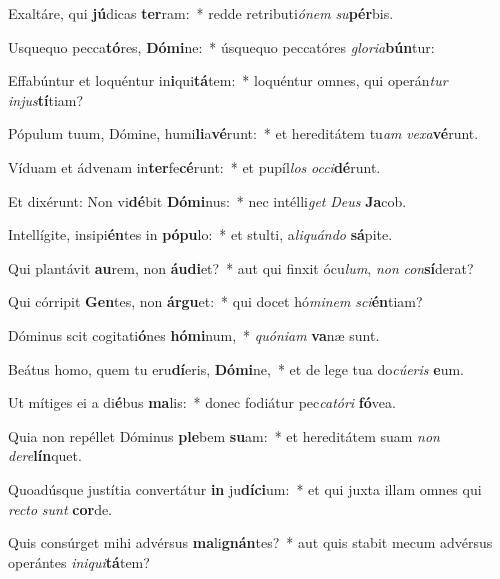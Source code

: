 \item Exaltáre, qui \textbf{jú}dicas \textbf{ter}ram:~* redde retributi\textit{ó}\textit{nem} \textit{su}\textbf{pér}bis.
\item Usquequo pecca\textbf{tó}res, \textbf{Dó}\textbf{mi}ne:~* úsquequo peccatóres \textit{glo}\textit{ri}\textit{a}\textbf{bún}tur:
\item Effabúntur et loquéntur in\textbf{i}qui\textbf{tá}tem:~* loquéntur omnes, qui operán\textit{tur} \textit{in}\textit{jus}\textbf{tí}tiam?
\item Pópulum tuum, Dómine, humi\textbf{li}a\textbf{vé}runt:~* et hereditátem tu\textit{am} \textit{ve}\textit{xa}\textbf{vé}runt.
\item Víduam et ádvenam in\textbf{ter}fe\textbf{cé}runt:~* et pupíl\textit{los} \textit{oc}\textit{ci}\textbf{dé}runt.
\item Et dixérunt: Non vi\textbf{dé}bit \textbf{Dó}\textbf{mi}nus:~* nec intélli\textit{get} \textit{De}\textit{us} \textbf{Ja}cob.
\item Intellígite, insipi\textbf{én}tes in \textbf{pó}\textbf{pu}lo:~* et stulti, a\textit{li}\textit{quán}\textit{do} \textbf{sá}pite.
\item Qui plantávit \textbf{au}rem, non \textbf{áu}\textbf{di}et?~* aut qui finxit ócu\textit{lum}, \textit{non} \textit{con}\textbf{sí}derat?
\item Qui córripit \textbf{Gen}tes, non \textbf{ár}\textbf{gu}et:~* qui docet hó\textit{mi}\textit{nem} \textit{sci}\textbf{én}tiam?
\item Dóminus scit cogitati\textbf{ó}nes \textbf{hó}\textbf{mi}num,~* \textit{quón}\textit{i}\textit{am} \textbf{va}næ sunt.
\item Beátus homo, quem tu eru\textbf{dí}eris, \textbf{Dó}\textbf{mi}ne,~* et de lege tua do\textit{cú}\textit{e}\textit{ris} \textbf{e}um.
\item Ut mítiges ei a di\textbf{é}bus \textbf{ma}lis:~* donec fodiátur pec\textit{ca}\textit{tó}\textit{ri} \textbf{fó}vea.
\item Quia non repéllet Dóminus \textbf{ple}bem \textbf{su}am:~* et hereditátem suam \textit{non} \textit{de}\textit{re}\textbf{lín}quet.
\item Quoadúsque justítia convertátur \textbf{in} ju\textbf{dí}\textbf{ci}um:~* et qui juxta illam omnes qui \textit{rec}\textit{to} \textit{sunt} \textbf{cor}de.
\item Quis consúrget mihi advérsus \textbf{ma}li\textbf{gnán}tes?~* aut quis stabit mecum advérsus operántes \textit{in}\textit{i}\textit{qui}\textbf{tá}tem?
